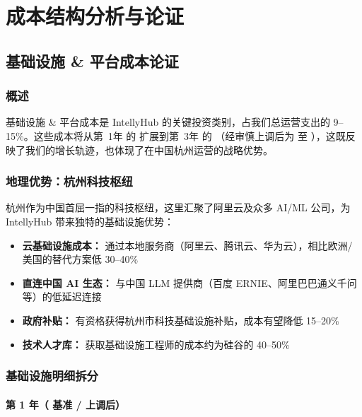 \documentclass[11pt, a4paper, oneside]{article}
\begin{document}


\restoregeometry
\endgroup

\section{成本结构分析与论证}
\label{sec:cost-analysis}

\subsection{基础设施 \& 平台成本论证}

\subsubsection{概述}
基础设施 \& 平台成本是 IntellyHub 的关键投资类别，占我们总运营支出的 9--15\%。这些成本将从第~1年 的  扩展到第~3年 的 （经审慎上调后为  至 ），这既反映了我们的增长轨迹，也体现了在中国杭州运营的战略优势。

\subsubsection{地理优势：杭州科技枢纽}
杭州作为中国首屈一指的科技枢纽，这里汇聚了阿里云及众多 AI/ML 公司，为 IntellyHub 带来独特的基础设施优势：

\begin{itemize}
    \item \textbf{云基础设施成本：} 通过本地服务商（阿里云、腾讯云、华为云），相比欧洲/美国的替代方案低 30--40\%
    \item \textbf{直连中国 AI 生态：} 与中国 LLM 提供商（百度 ERNIE、阿里巴巴通义千问等）的低延迟连接
    \item \textbf{政府补贴：} 有资格获得杭州市科技基础设施补贴，成本有望降低 15--20\%
    \item \textbf{技术人才库：} 获取基础设施工程师的成本约为硅谷的 40--50\%
\end{itemize}

\subsubsection{基础设施明细拆分}

\paragraph{第 1 年（ 基准 /  上调后）}
\end{document}
